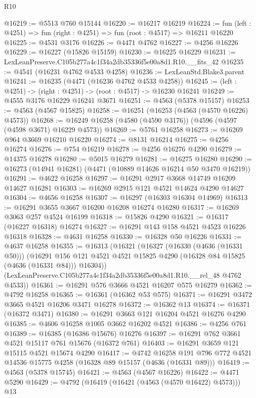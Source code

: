 \begin{lexlean}{R10}
\begin{coremodule}
@16219 := @5513 @760 @15144
@16220 := @16217 @16219
@16224 := fun (left : @4251) => fun (right : @4251) => fun (root : @4517) => @16211 @16220
@16225 := @4531 @3176
@16226 := @4471 @4762
@16227 := @4256 @16226
@16229 := @16227 (@15826 @15159)
@16230 := @16225 @16229
@16231 := LexLeanPreserve.C105b277a4c1f34a2db35336f5e00a8d1.R10.__fits_42
@16235 := @4541 (@16231 @4762 @4533 @4258)
@16236 := LexLeanStd.Blake3.parent
@16241 := @16235 (@4471 (@16236 @4762 @4533 @4258))
@16245 := (left : @4251) -> (right : @4251) -> (root : @4517) -> @16230 @16241
@16249 := @4555 @3176 @16229 @16241 @3671
@16251 := @4563 (@5378 @15157)
@16253 := @4563 (@4567 @15825)
@16258 := @16251 (@16253 (@4563 (@4570 @16226) @4573))
@16268 := @16249 @16258 (@4580 (@4590 @3176)) (@4596 (@4597 (@4598 @3671) @16229 @4573))
@16269 := @5761 @16258
@16273 := @16269 @964 @3669 @16210 @16220
@16274 := @8131 @16214
@16275 := @4256 @16274
@16276 := @754 @16219
@16278 := @4256 @16276 @4290
@16279 := @14375 @16278
@16280 := @5015 @16279
@16281 := @16275 @16280
@16290 := @16273 (@14941 @16281) (@4471 (@10889 @14626 @16214 @50 @3470 @16219))
@16291 := @4622 @16258
@16297 := @16291 @2917 @3668 @14749 @16209 @14627 @16281
@16303 := @16269 @2915 @121 @4521 @14624 @4290 @14627
@16304 := @4656 @16258
@16307 := @16297 (@16303 @16304 @14969)
@16313 := @16291 @3655 @3667 @16200 @16208 @16274 @16280
@16317 := @16269 @3063 @257 @4524 @16199
@16318 := @15826 @4290
@16321 := @16317 (@16227 @16318) @16274
@16327 := @16291 @143 @158 @4521 @4523 @16226 @16318
@16328 := @4631 @16258
@16330 := @16328 @50 @16226
@16331 := @4637 @16258
@16355 := @16313
    (@16321
      (@16327
        (@16330 (@4636 (@16331 @50)))
        (@16291 @156 @121 @4521 @4521 @15825 @4290 (@16328 @84 @15825 (@4636 (@16331 @84))) @16304))
      (LexLeanPreserve.C105b277a4c1f34a2db35336f5e00a8d1.R10.__rel_48 @4762 @4533))
@16361 := @16291 @576 @3666 @4521 @16207 @575 @16279
@16362 := @4792 @16258
@16365 := @16361 (@16362 @53 @575)
@16371 := @16291 @3472 @3665 @4521 @16206 @3471 @16278
@16372 := @16362 @13
@16374 := @16371 (@16372 @3471)
@16380 := @16291 @3663 @121 @16204 @4521 @16276 @4290
@16385 := @4606 @16258 @1005 @3662 @16202 @4521
@16386 := @4256 @761
@16389 := @16385 (@16386 @15676) @16276
@16397 := @16291 @762 @3661 @4521 @15117 @761 @15676 (@16372 @761)
@16403 := @16291 @3659 @121 @15115 @4521 @15674 @4290
@16417 := @4742
    @16258
    @191
    @796
    @772
    @4521
    @14536
    @15775
    @4258
    (@16328 @89 @15157 (@4636 (@16331 @89)))
@16419 := @4563 (@5378 @15745)
@16421 := @4563 (@4567 @16226)
@16422 := @4471 @5290
@16429 := @4792 (@16419 (@16421 (@4563 (@4570 @16422) @4573))) @13

\end{coremodule}
\end{lexlean}
